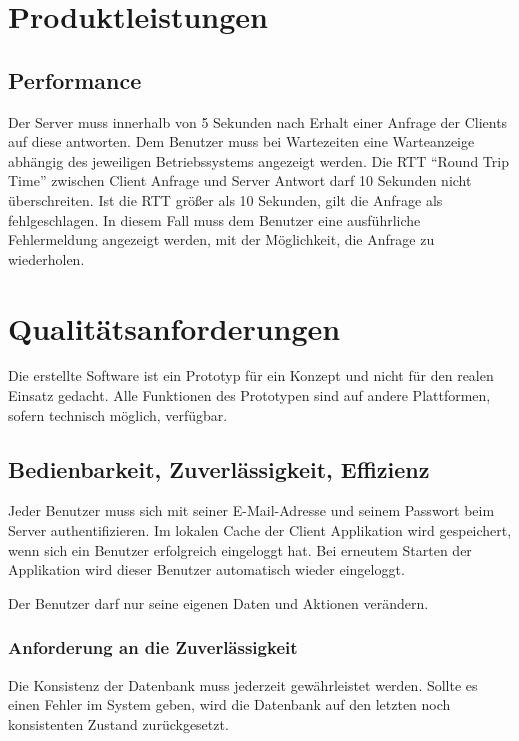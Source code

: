 \documentclass[a4paper,12pt,oneside]{scrartcl}
\begin{document}
\section{Produktleistungen}
\hypertarget{s07}{\subsection{Performance}}
Der Server muss innerhalb von 5 Sekunden nach Erhalt einer Anfrage der Clients auf diese antworten.
Dem Benutzer muss bei Wartezeiten eine Warteanzeige abhängig des jeweiligen Betriebssystems angezeigt werden. 
Die RTT "`Round Trip Time"' zwischen Client Anfrage und Server Antwort darf 10 Sekunden nicht überschreiten.
Ist die RTT größer als 10 Sekunden, gilt die Anfrage als fehlgeschlagen.
In diesem Fall muss dem Benutzer eine ausführliche Fehlermeldung angezeigt werden, mit der Möglichkeit, die Anfrage zu wiederholen. 




\section{Qualitätsanforderungen}
Die erstellte Software ist ein Prototyp für ein Konzept und nicht für den realen Einsatz gedacht.
Alle Funktionen des Prototypen sind auf andere Plattformen, sofern technisch möglich, verfügbar.


\subsection{Bedienbarkeit, Zuverlässigkeit, Effizienz}
Jeder Benutzer muss sich mit seiner E-Mail-Adresse und seinem Passwort beim Server authentifizieren. 
Im lokalen Cache der Client Applikation wird gespeichert, wenn sich ein Benutzer erfolgreich eingeloggt hat. 
Bei erneutem Starten der Applikation wird dieser Benutzer automatisch wieder eingeloggt. 

Der Benutzer darf nur seine eigenen Daten und Aktionen verändern.



\subsubsection{Anforderung an die Zuverlässigkeit}
Die Konsistenz der Datenbank muss jederzeit gewährleistet werden.
Sollte es einen Fehler im System geben, wird die Datenbank auf den letzten noch konsistenten Zustand zurückgesetzt.
\end{document}
